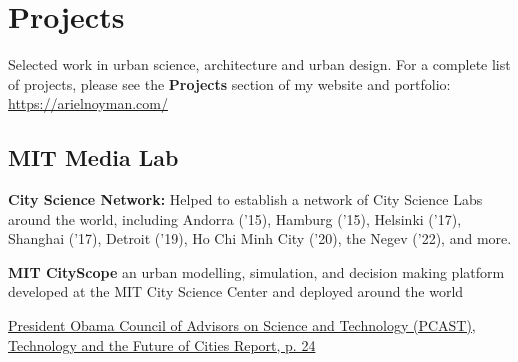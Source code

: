 \section*{Projects}
Selected work in urban science, architecture and urban design. For a complete list of projects, please see the \textbf{Projects} section of my website and portfolio: \href{https://arielnoyman.com/}{https://arielnoyman.com/}

\subsection*{MIT Media Lab}

\begin{tablist}

    \item[`15 --] \tab \textbf{City Science Network:} {Helped to establish a network of City Science Labs around the world, including Andorra ('15), Hamburg ('15), Helsinki ('17), Shanghai ('17), Detroit ('19), Ho Chi Minh City ('20), the Negev ('22), and more.}

    \begin{tablist}
        \item[`22 --] 
    \end{tablist}

    \begin{tablist}
        \item[`15 --] 
    \end{tablist}




    \item[`14 --] \tab \textbf{MIT CityScope} {an urban modelling, simulation, and decision making platform developed at the MIT City Science Center and deployed around the world}

    \begin{tablist}
        \item[`16] \tab \href{https://obamawhitehouse.archives.gov/blog/2016/02/23/pcast-releases-technology-and-future-cities-report-president}{President Obama Council of Advisors on Science and Technology (PCAST), Technology and the Future of Cities Report, p. 24}
    \end{tablist}


\end{tablist}
